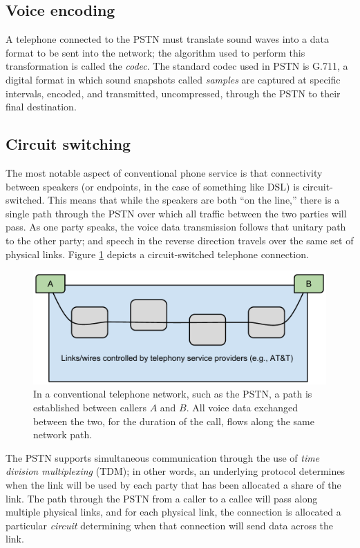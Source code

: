 \documentclass[11pt]{article}
\newcommand{\term}[1]{\textit{#1}}
\begin{document}
\subsection{Voice encoding}

A telephone connected to the PSTN must translate sound waves into a data format
to be sent into the network; the algorithm used to perform this transformation
is called the \term{codec}. The standard codec used in PSTN is G.711, a digital
format in which sound snapshots called \term{samples} are captured at specific
intervals, encoded, and transmitted, uncompressed, through the PSTN to their
final destination. \cite{coding,vostron}

\subsection{Circuit switching}

The most notable aspect of conventional phone service is that connectivity
between speakers (or endpoints, in the case of something like DSL) is
circuit-switched. This means that while the speakers are both ``on the line,''
there is a single path through the PSTN over which all traffic between the two
parties will pass.  As one party speaks, the voice data transmission follows
that unitary path to the other party; and speech in the reverse direction
travels over the same set of physical links. \cite{privateline} Figure
\ref{fig:conventional} depicts a circuit-switched telephone connection.

\begin{figure}
	\centering
	\includegraphics[width=\textwidth]{circuit_switched}
	\caption{
		In a conventional telephone network, such as the PSTN, a path is established
		between callers $A$ and $B$. All voice data exchanged between the two, for
		the duration of the call, flows along the same network path.
	}
	\label{fig:conventional}
\end{figure}

The PSTN supports simultaneous communication through the use of \term{time
division multiplexing} (TDM); in other words, an underlying protocol determines
when the link will be used by each party that has been allocated a share of the
link. The path through the PSTN from a caller to a callee will pass along
multiple physical links, and for each physical link, the connection is allocated
a particular \term{circuit} determining when that connection will send data
across the link. \cite{pstn_ppt}
\end{document}
